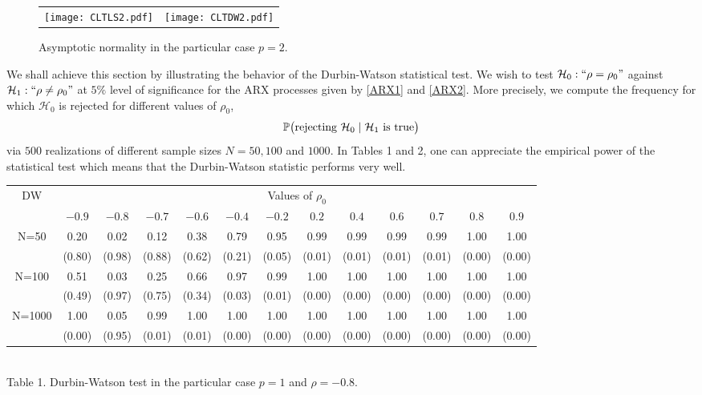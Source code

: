 \documentclass[article,12pt]{amsart}
\numberwithin{equation}{section}
\theoremstyle{plain}
\begin{document}
\begin{figure}[H] 
\label{FigCLT2}
\vspace{-2cm}
\begin{center}
\begin{tabular}{cc}
\texttt{[image: CLTLS2.pdf]}
&
\texttt{[image: CLTDW2.pdf]}
\end{tabular}
\end{center}
\vspace{-2cm}
\caption{Asymptotic normality in the particular case $p=2$.}
\end{figure}

We shall achieve this section by illustrating the behavior of the Durbin-Watson statistical test.
We wish to test ${\mathcal{H}}_0 : ``\rho = \rho_0"$ against ${\mathcal{H}}_1 : ``\rho \not= \rho_0"$ 
at $5\%$ level of significance for the ARX processes given by \eqref{ARX1} and \eqref{ARX2}.
More precisely, we compute the frequency for which ${\mathcal{H}}_0$ is rejected for different values of $\rho_0$,
\begin{equation*}
{\mathbb{P}}\big( \text{rejecting } {\mathcal{H}}_0 \hspace{0.1cm} \vert \hspace{0.1cm} {\mathcal{H}}_1 \text{ is true} \big)
\end{equation*}
via $500$ realizations of different sample sizes $N=50, 100$ and $1000$.
In Tables 1 and 2, one can appreciate the empirical power of the statistical test
which means that the Durbin-Watson statistic performs very well.

\medskip

\begin{center}
\tiny
\begin{tabular}{|c|c|c|c|c|c|c|c|c|c|c|c|c|}
\hline
\multirow{2}{*}{DW} & \multicolumn{12}{c|}{Values of $\rho_0$} \\
\cline{2-13}
& $-0.9$ & $-0.8$ & $-0.7$ & $-0.6$ & $-0.4$ & $-0.2$ & $0.2$ & $0.4$ & $0.6$ & $0.7$ & $0.8$ & $0.9$  \\
\hline
\multirow{2}{*}{N=50} & 0.20 & 0.02 & 0.12 & 0.38 & 0.79 & 0.95 & 0.99 & 0.99 & 0.99 & 0.99 & 1.00 & 1.00 \\
 & (0.80) & (0.98) & (0.88) & (0.62) & (0.21) & (0.05) & (0.01) & (0.01) & (0.01) & (0.01) & (0.00) & (0.00) \\
\hline
\multirow{2}{*}{N=100} & 0.51 & 0.03 & 0.25 & 0.66 & 0.97 & 0.99 & 1.00 & 1.00 & 1.00 & 1.00 &1.00 & 1.00 \\
 & (0.49) & (0.97) & (0.75) & (0.34) & (0.03) & (0.01) & (0.00) & (0.00) &  (0.00) & (0.00) &  (0.00) & (0.00) \\
\hline
\multirow{2}{*}{N=1000} & 1.00 & 0.05 & 0.99 & 1.00 & 1.00 & 1.00 & 1.00 & 1.00 & 1.00 & 1.00 &1.00 & 1.00 \\
 & (0.00) & (0.95) & (0.01) & (0.01) & (0.00) & (0.00) & (0.00) & (0.00) &  (0.00) & (0.00) &  (0.00) & (0.00) \\
\hline
\end{tabular}\\
\vspace{0.5cm}
\normalsize
Table 1. Durbin-Watson test in the particular case $p=1$ and $\rho=-0.8$.
\end{center}
\end{document}
